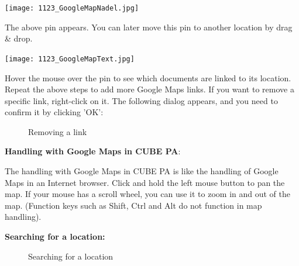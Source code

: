 \vspace{4mm}

\hspace{15mm} \texttt{[image: 1123\_GoogleMapNadel.jpg]}

The above pin appears. You can later move this pin to another location by drag \& drop. 

\hspace{15mm} \texttt{[image: 1123\_GoogleMapText.jpg]}

Hover the mouse over the pin to see which documents are linked to its location. \\

Repeat the above steps to add more Google Maps links. If you want to remove a specific link, right-click on it. The following dialog appears, and you need to confirm it by clicking 'OK':

\begin{figure}[H]
\caption{Removing a link}
\end{figure}

\vspace{\baselineskip}

\textbf{Handling with Google Maps in CUBE PA}:

The handling with Google Maps in CUBE PA is like the handling of Google Maps in an Internet browser. Click and hold the left mouse button to pan the map. If your mouse has a scroll wheel, you can use it to zoom in and out of the map. (Function keys such as Shift, Ctrl and Alt do not function in map handling).

\vspace{\baselineskip}

\textbf{Searching for a location:} 

\begin{figure}[H]
\caption{Searching for a location}
\end{figure}

